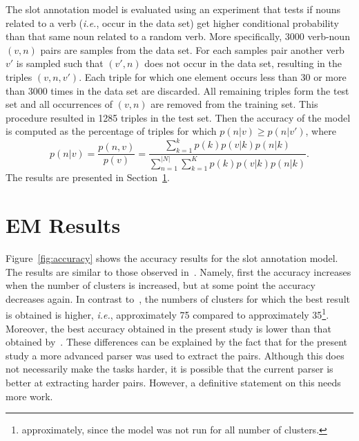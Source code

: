 \documentclass[11pt]{scrartcl}
\newcommand{\ie}{\textit{i.e.}}
\begin{document}
The slot annotation model is evaluated using an experiment that tests
if nouns related to a verb (\ie, occur in the data set) get higher
conditional probability than that same noun related to a random
verb. More specifically, 3000 verb-noun $(v, n)$ pairs are samples
from the data set. For each samples pair another verb $v'$ is sampled
such that $(v', n)$ does not occur in the data set, resulting in the
triples $(v, n , v')$. Each triple for which one element occurs less
than 30 or more than 3000 times in the data set are discarded. All
remaining triples form the test set and all occurrences of $(v, n)$
are removed from the training set. This procedure resulted in 1285
triples in the test set. Then the accuracy of the model is computed as
the percentage of triples for which $p(n|v) \ge p(n|v')$, where
\[
  p(n|v) = \frac{p(n, v)}{p(v)} =
  \frac{\sum_{k=1}^k p(k)p(v|k)p(n|k)}{\sum_{n=1}^{|N|}\sum_{k=1}^K p(k)p(v|k)p(n|k)}.
\]
The results are presented in Section~\ref{sec:results}.

\section{EM Results} %
\label{sec:results}
Figure~\ref{fig:accuracy} shows the accuracy results for the slot
annotation model. The results are similar to those observed
in~\cite{rooth1999inducing}. Namely, first the accuracy increases when
the number of clusters is increased, but at some point the accuracy
decreases again. In contrast to~\cite{rooth1999inducing}, the numbers
of clusters for which the best result is obtained is higher, \ie,
approximately 75 compared to approximately 35\footnote{approximately,
since the model was not run for all number of clusters.}. Moreover,
the best accuracy obtained in the present study is lower than that
obtained by~\cite{rooth1999inducing}. These differences can be
explained by the fact that for the present study a more advanced
parser was used to extract the pairs. Although this does not
necessarily make the tasks harder, it is possible that the current
parser is better at extracting harder pairs. However, a definitive
statement on this needs more work.
\end{document}
